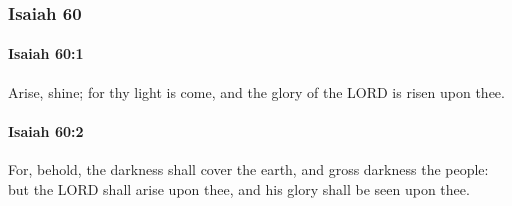 	\subsubsection{Isaiah 60} %
		\label{ISAIAH-60}

		\paragraph{Isaiah 60:1} %
			\label{ISAIAH-60-1}

			Arise, shine; for thy light is come, and the glory of the LORD is risen upon thee.


		\paragraph{Isaiah 60:2} %
			\label{ISAIAH-60-2}

			For, behold, the darkness shall cover the earth, and gross darkness the people: but the LORD shall arise upon thee, and his glory shall be seen upon thee.

